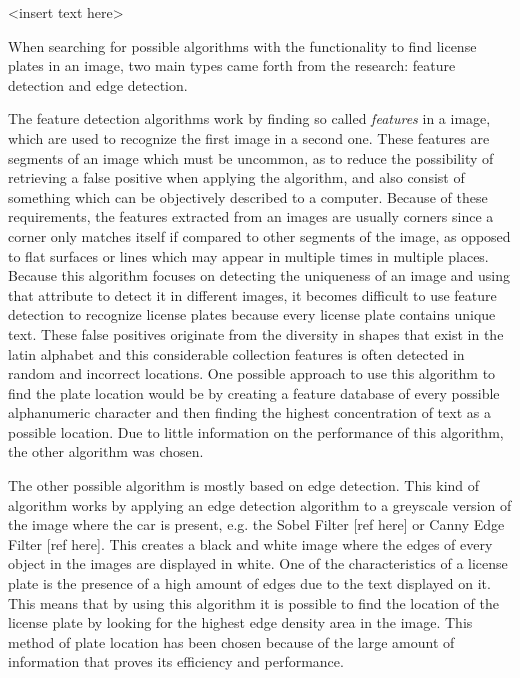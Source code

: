 
<insert text here>



When searching for possible algorithms with the functionality to find license plates in an image, two main types came forth from the research: feature detection and edge detection. 

The feature detection algorithms work by finding so called \emph{features} in a image, which are used to recognize the first image in a second one. These features are segments of an image which must be uncommon, as to reduce the possibility of retrieving a false positive when applying the algorithm, and also consist of something which can be objectively described to a computer. Because of these requirements, the features extracted from an images are usually corners since a corner only matches itself if compared to other segments of the image, as opposed to flat surfaces or lines which may appear in multiple times in multiple places. Because this algorithm focuses on detecting the uniqueness of an image and using that attribute to detect it in different images, it becomes difficult to use feature detection to recognize license plates because every license plate contains unique text. These false positives originate from the diversity in shapes that exist in the latin alphabet and this considerable collection features is often detected in random and incorrect locations. One possible approach to use this algorithm to find the plate location would be by creating a feature database of every possible alphanumeric character and then finding the highest concentration of text as a possible location. Due to little information on the performance of this algorithm, the other algorithm was chosen.

The other possible algorithm is mostly based on edge detection. This kind of algorithm works by applying an edge detection algorithm to a greyscale version of the image where the car is present, e.g. the Sobel Filter [ref here] or Canny Edge Filter [ref here]. This creates a black and white image where the edges of every object in the images are displayed in white. One of the characteristics of a license plate is the presence of a high amount of edges due to the text displayed on it. This means that by using this algorithm it is possible to find the location of the license plate by looking for the highest edge density area in the image. This method of plate location has been chosen because of the large amount of information that proves its efficiency and performance.

